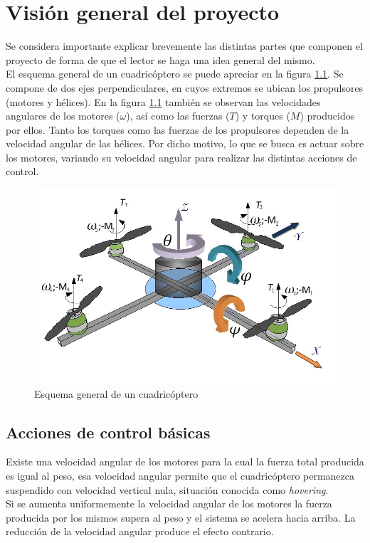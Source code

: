 \documentclass[main]{subfiles}
\begin{document}
\chapter{Visi\'on general del proyecto}
\label{chap:general}
Se considera importante explicar brevemente las distintas partes que componen el proyecto de forma de que el lector se haga una idea general del mismo.\\

El esquema general de un cuadric\'optero se puede apreciar en la figura \ref{fig:cuad}. Se compone de dos ejes perpendiculares, en cuyos extremos se ubican los propulsores (motores y h\'elices). En la figura \ref{fig:cuad} tambi\'en se observan las velocidades angulares de los motores ($\omega$), as\'i como las fuerzas ($T$) y torques ($M$) producidos por ellos. Tanto los torques como las fuerzas de los propulsores dependen de la velocidad angular de las h\'elices. Por dicho motivo, lo que se busca es actuar sobre los motores, variando su velocidad angular para realizar las distintas acciones de control.

\begin{figure}
\centering
\includegraphics[scale=0.4]{./pics_general/quad_hov.jpg}
\caption{Esquema general de un cuadric\'optero}
\label{fig:cuad}
\end{figure}
\section{Acciones de control b\'asicas}
Existe una velocidad angular de los motores para la cual la fuerza total producida es igual al peso, esa velocidad angular permite que el cuadric\'optero permanezca suspendido con velocidad vertical nula, situaci\'on conocida como \emph{hovering}.\\ Si se aumenta uniformemente la velocidad angular de los motores la fuerza producida por los mismos supera al peso y el sistema se acelera hacia arriba. La reducción de la velocidad angular produce el efecto contrario.\\
\end{document}
